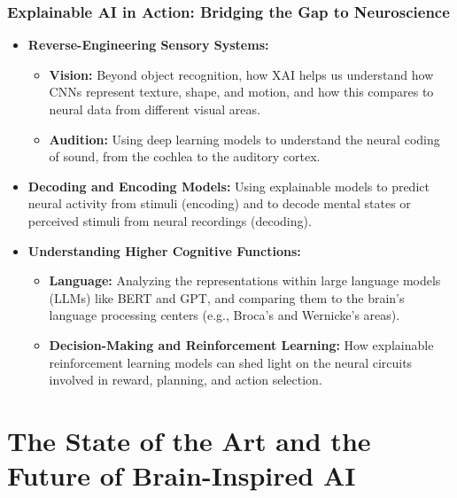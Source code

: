 \documentclass[11pt,a4paper]{article}
\begin{document}
\section{Explainable AI in Action: Bridging the Gap to Neuroscience}
\begin{itemize}
    \item \textbf{Reverse-Engineering Sensory Systems:}
        \begin{itemize}
            \item \textbf{Vision:} Beyond object recognition, how XAI helps us understand how CNNs represent texture, shape, and motion, and how this compares to neural data from different visual areas.
            \item \textbf{Audition:} Using deep learning models to understand the neural coding of sound, from the cochlea to the auditory cortex.
        \end{itemize}
    \item \textbf{Decoding and Encoding Models:} Using explainable models to predict neural activity from stimuli (encoding) and to decode mental states or perceived stimuli from neural recordings (decoding).
    \item \textbf{Understanding Higher Cognitive Functions:}
        \begin{itemize}
            \item \textbf{Language:} Analyzing the representations within large language models (LLMs) like BERT and GPT, and comparing them to the brain's language processing centers (e.g., Broca's and Wernicke's areas).
            \item \textbf{Decision-Making and Reinforcement Learning:} How explainable reinforcement learning models can shed light on the neural circuits involved in reward, planning, and action selection.
        \end{itemize}
\end{itemize}

\clearpage

\part{The State of the Art and the Future of Brain-Inspired AI}
\end{document}
